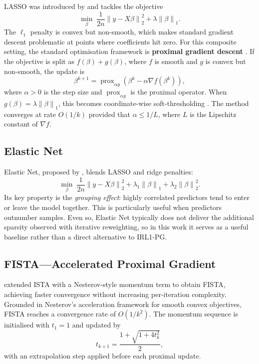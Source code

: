 \documentclass[12pt,a4paper]{article}
\DeclareMathOperator{\prox}{prox}
\newcommand{\norm}[1]{\left\|#1\right\|}
\begin{document}
LASSO was introduced by \citet{tibshirani1996} and tackles the objective
\begin{equation}
    \min_{\beta} \; \frac{1}{2n}\norm{y - X\beta}_2^2 + \lambda \norm{\beta}_1.
    \label{eq:lasso}
\end{equation}
The $\ell_1$ penalty is convex but non-smooth, which makes standard gradient descent
problematic at points where coefficients hit zero.  For this composite setting,
the standard optimisation framework is \textbf{proximal gradient descent}
\citep{parikh2014}.  If the objective is split as $f(\beta) + g(\beta)$, where
$f$ is smooth and $g$ is convex but non-smooth, the update is
\begin{equation}
    \beta^{k+1} = \prox_{\alpha g}\!\left(\beta^k - \alpha \nabla f(\beta^k)\right),
    \label{eq:proxgrad}
\end{equation}
where $\alpha > 0$ is the step size and $\prox_{\alpha g}$ is the proximal operator.
When $g(\beta) = \lambda\norm{\beta}_1$, this becomes coordinate-wise soft-thresholding
\citep{beck2009}.  The method converges at rate $O(1/k)$ provided that
$\alpha \leq 1/L$, where $L$ is the Lipschitz constant of $\nabla f$.

\subsection{Elastic Net}

Elastic Net, proposed by \citet{zouhastie2005}, blends LASSO and ridge penalties:
\begin{equation}
    \min_{\beta} \; \frac{1}{2n}\norm{y - X\beta}_2^2
    + \lambda_1 \norm{\beta}_1 + \lambda_2 \norm{\beta}_2^2.
    \label{eq:elasticnet}
\end{equation}
Its key property is the \emph{grouping effect}: highly correlated predictors tend to
enter or leave the model together.  This is particularly useful when predictors
outnumber samples.  Even so, Elastic Net typically does not deliver the additional
sparsity observed with iterative reweighting, so in this work it serves as a useful
baseline rather than a direct alternative to IRL1-PG.

\subsection{FISTA---Accelerated Proximal Gradient}

\citet{beck2009} extended ISTA with a Nesterov-style momentum term to obtain FISTA,
achieving faster convergence without increasing per-iteration complexity.  Grounded in
Nesterov's \citeyearpar{nesterov1983} acceleration framework for smooth convex
objectives, FISTA reaches a convergence rate of $O(1/k^2)$.  The momentum sequence is
initialised with $t_1 = 1$ and updated by
\begin{equation}
    t_{k+1} = \frac{1 + \sqrt{1 + 4t_k^2}}{2},
    \label{eq:fista_t}
\end{equation}
with an extrapolation step applied before each proximal update.
\end{document}
